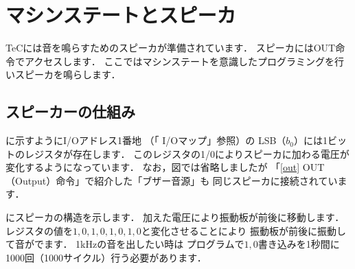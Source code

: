 %

\newpage
\section{マシンステートとスピーカ}

TeCには音を鳴らすためのスピーカが準備されています．
スピーカにはOUT命令でアクセスします．
ここではマシンステートを意識したプログラミングを行いスピーカを鳴らします．

\subsection{スピーカーの仕組み}
に示すようにI/Oアドレス1番地
（「 I/Oマップ」参照）の
LSB（$b_0$）には1ビットのレジスタが存在します．
このレジスタの1/0によりスピーカに加わる電圧が変化するようになっています．
なお，図では省略しましたが
「\ref{out} OUT（Output）命令」で紹介した「ブザー音源」も
同じスピーカに接続されています．


にスピーカの構造を示します．
加えた電圧により振動板が前後に移動します．
レジスタの値を$1,0,1,0,1,0,1,0$と変化させることにより
振動板が前後に振動して音がでます．
1kHzの音を出したい時は
プログラムで$1,0$書き込みを1秒間に1000回（1000サイクル）行う必要があります．

